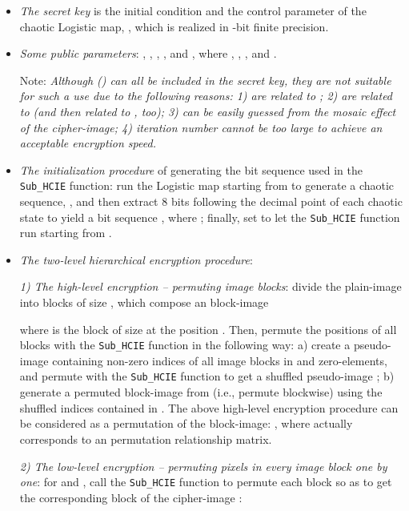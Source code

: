 \documentclass[final,3p,times,twocolumn]{elsarticle}
\begin{document}
\begin{itemize}
\item \textit{The secret key} is the initial condition  and
the control parameter  of the chaotic Logistic map,  \cite{Devaney:Chaos:2003}, which is realized in -bit finite precision.

\item \textit{Some public parameters}: , , ,
,  and , where ,
, , and .

Note: {\it Although () can all be
included in the secret key, they are not suitable for such a use
due to the following reasons: 1)  are related to ;
2)  are related to  (and then
related to , too); 3)  can be easily guessed from
the mosaic effect of the cipher-image; 4) iteration number  cannot be too large
to achieve an acceptable encryption speed.}

\item \textit{The initialization procedure} of generating the bit
sequence used in the \texttt{Sub\_HCIE} function: run the Logistic
map starting from  to generate a chaotic sequence,
, and then extract 8
bits following the decimal point of each chaotic state  to
yield a bit sequence , where
; finally, set  to let the \texttt{Sub\_HCIE} function
run starting from .

\item \textit{The two-level hierarchical encryption procedure}:

\textit{1) The high-level encryption -- permuting image
blocks}: divide the plain-image  into blocks of size , which compose an 
block-image

where  is the block of size  at the
position . Then, permute the positions of all blocks with
the \texttt{Sub\_HCIE} function in the following way:
a) create a pseudo-image 
containing  non-zero
indices of all image blocks in  and  zero-elements, and
permute  with the \texttt{Sub\_HCIE} function to get a
shuffled pseudo-image ; b) generate a permuted block-image  from  (i.e.,
permute  blockwise) using the shuffled indices contained in
.
The above high-level encryption procedure can be considered as a
permutation of the block-image:
, where
 actually corresponds to an
 permutation relationship matrix.

\textit{2) The low-level encryption -- permuting pixels in every
image block one by one}: for  and
, call the \texttt{Sub\_HCIE}
function to permute each block  so as to get the
corresponding block of the cipher-image :

\end{itemize}
\end{document}
